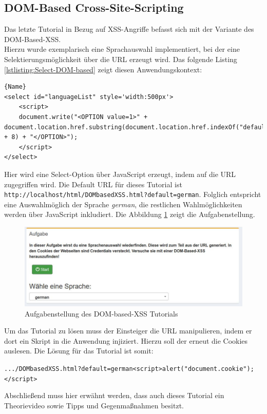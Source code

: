 \subsection{DOM-Based Cross-Site-Scripting}
Das letzte Tutorial in Bezug auf XSS-Angriffe befasst sich mit der Variante des DOM-Based-XSS. \\ 
Hierzu wurde exemplarisch eine Sprachauswahl implementiert, bei der eine Selektierungsmöglichkeit über die URL erzeugt wird. Das folgende Listing \ref{lstlisting:Select-DOM-based} zeigt diesen Anwendungskontext: 
\begin{lstlisting}[caption=Select-Statement\label{lstlisting:Select-DOM-based}]{Name}
<select id="languageList" style='width:500px'>
	<script>
	document.write("<OPTION value=1>" + 				document.location.href.substring(document.location.href.indexOf("default=") + 8) + "</OPTION>");
	</script>
</select>
\end{lstlisting}
Hier wird eine Select-Option über JavaScript erzeugt, indem auf die URL zugegriffen wird. Die Default URL für dieses Tutorial ist \colorbox{altgray}{\lstinline|http://localhost/html/DOMbasedXSS.html?default=german|}. Folglich entspricht eine Auswahlmöglich der Sprache \textit{german}, die restlichen Wahlmöglichkeiten werden über JavaScript inkludiert. Die Abbildung \ref{fig:dom-based-xss-aufgabe} zeigt die Aufgabenstellung. 
\begin{figure}[H]
	\centering
	\includegraphics[width=\textwidth]{images/XSS/dom-based-xss-aufgabe.jpg}
	\caption{Aufgabenstellung des DOM-based-XSS Tutorials}
	\label{fig:dom-based-xss-aufgabe}
\end{figure}
Um das Tutorial zu lösen muss der Einsteiger die URL manipulieren, indem er dort ein Skript in die Anwendung injiziert. Hierzu soll der erneut die Cookies auslesen. Die Lösung für das Tutorial ist somit: 
\begin{center} 
\colorbox{altgray}{\lstinline|.../DOMbasedXSS.html?default=german<script>alert("document.cookie");</script>|} 
\end{center}
Abschließend muss hier erwähnt werden, dass auch dieses Tutorial ein Theorievideo sowie Tipps und Gegenmaßnahmen besitzt. 





